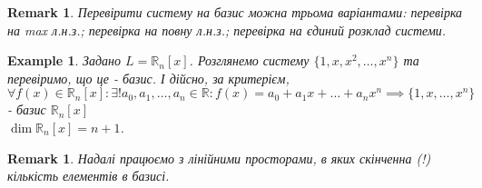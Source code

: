 \documentclass[a4paper, 10pt]{article}
\theoremstyle{theoremdd}
\newtheorem{example}[theorem]{Example}
\newtheorem{remark}[theorem]{Remark}
\begin{document}
	\begin{remark}
	Перевірити систему на базис можна трьома варіантами: перевірка на max л.н.з.; перевірка на повну л.н.з.; перевірка на єдиний розклад системи.
	\end{remark}
	
	\begin{example}
	Задано $L = \mathbb{R}_n[x]$. Розглянемо систему $\{1, x, x^2, \dots, x^n\}$ та перевіримо, що це - базис. І дійсно, за критерієм,\\
	$\forall f(x) \in \mathbb{R}_n[x]: \exists! a_0, a_1, \dots, a_n \in \mathbb{R}: f(x) = a_0 + a_1 x + \dots + a_n x^n \implies \{1, x, \dots, x^n\}$ - базис $\mathbb{R}_n[x]$ \\ $\dim{\mathbb{R}_n[x]} = n+1$.
	\end{example}
	
	\begin{remark}
	Надалі працюємо з лінійними просторами, в яких скінченна (!) кількість елементів в базисі.
	\end{remark}
	
\end{document}
